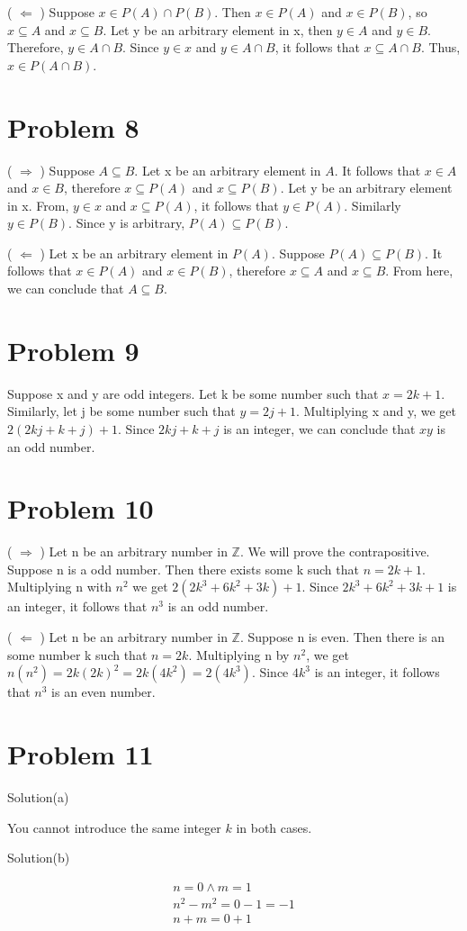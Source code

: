 \documentclass{article}
\begin{document}
( $\Leftarrow$ ) Suppose $x \in P(A) \cap P(B)$. Then $x \in P(A)$ and
$x \in P(B)$, so $x \subseteq A$ and $x \subseteq B$. Let y be an
arbitrary element in x, then $y \in A$ and $y \in B$. Therefore, $y
\in A \cap B$. Since $y \in x$ and $y \in A \cap B$, it follows that
$x \subseteq A \cap B$. Thus, $x \in P(A \cap B)$.

\section{Problem 8}

( $\Rightarrow$ ) Suppose $A \subseteq B$. Let x be an arbitrary
element in $A$. It follows that $x \in A$ and $x \in B$, therefore $x
\subseteq P(A)$ and $x \subseteq P(B)$. Let y be an arbitrary element
in x. From, $y \in x$ and $x \subseteq P(A)$, it follows that $y \in
P(A)$. Similarly $y \in P(B)$. Since y is arbitrary, $P(A) \subseteq
P(B)$.

( $\Leftarrow$ ) Let x be an arbitrary element in $P(A)$. Suppose
$P(A) \subseteq P(B)$. It follows that $x \in P(A)$ and $x \in P(B)$,
therefore $x \subseteq A$ and $x \subseteq B$. From here, we can
conclude that $A \subseteq B$.

\section{Problem 9}

Suppose x and y are odd integers. Let k be some number such that $x =
2k + 1$. Similarly, let j be some number such that $y = 2j + 1$.
Multiplying x and y, we get $2(2kj + k + j) + 1$. Since $2kj + k + j$
is an integer, we can conclude that $xy$ is an odd number.

\section{Problem 10}

( $\Rightarrow$ ) Let n be an arbitrary number in $ \mathbb{Z}$. We will prove
the contrapositive. Suppose n is a odd number. Then there exists some
k such that $n = 2k + 1$. Multiplying n with $n^2$ we get $2(2k^3 +
6k^2 + 3k) + 1$. Since $2k^3 + 6k^2 + 3k + 1$ is an integer, it
follows that $n^3$ is an odd number.

( $\Leftarrow$ ) Let n be an arbitrary number in $ \mathbb{Z} $. Suppose n is
even. Then there is an some number k such that $n = 2k$. Multiplying n
by $n^2$, we get $n(n^2) = 2k(2k)^2 = 2k(4k^2) = 2(4k^3)$. Since
$4k^3$ is an integer, it follows that $n^3$ is an even number.

\section{Problem 11}

Solution(a)

You cannot introduce the same integer $k$ in both cases.

Solution(b)

\begin{align*}
  n = 0 \land m = 1 \\
  n^2 - m^2 = 0 - 1 = -1 \\
  n + m = 0 + 1 \\
\end{align*}
\end{document}
